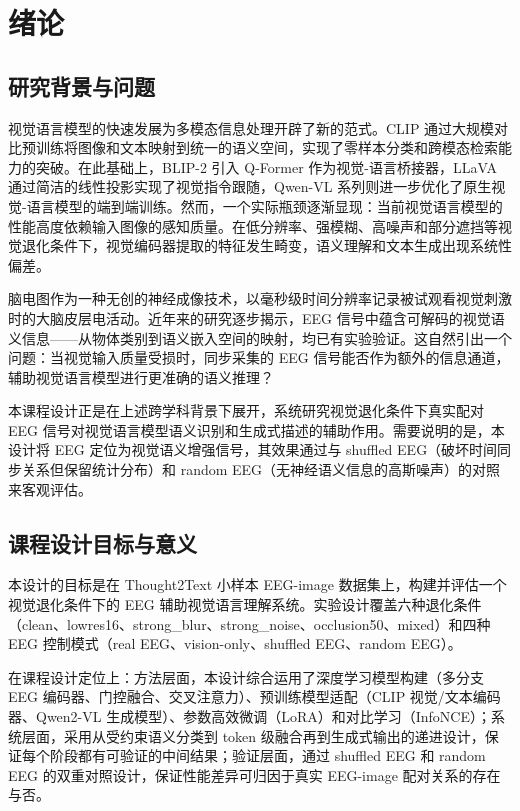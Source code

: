 \section{绪论}

\subsection{研究背景与问题}

视觉语言模型的快速发展为多模态信息处理开辟了新的范式。CLIP 通过大规模对比预训练将图像和文本映射到统一的语义空间，实现了零样本分类和跨模态检索能力的突破。在此基础上，BLIP-2 引入 Q-Former 作为视觉-语言桥接器，LLaVA 通过简洁的线性投影实现了视觉指令跟随，Qwen-VL 系列则进一步优化了原生视觉-语言模型的端到端训练。然而，一个实际瓶颈逐渐显现：当前视觉语言模型的性能高度依赖输入图像的感知质量。在低分辨率、强模糊、高噪声和部分遮挡等视觉退化条件下，视觉编码器提取的特征发生畸变，语义理解和文本生成出现系统性偏差。

脑电图作为一种无创的神经成像技术，以毫秒级时间分辨率记录被试观看视觉刺激时的大脑皮层电活动。近年来的研究逐步揭示，EEG 信号中蕴含可解码的视觉语义信息——从物体类别到语义嵌入空间的映射，均已有实验验证。这自然引出一个问题：当视觉输入质量受损时，同步采集的 EEG 信号能否作为额外的信息通道，辅助视觉语言模型进行更准确的语义推理？

本课程设计正是在上述跨学科背景下展开，系统研究视觉退化条件下真实配对 EEG 信号对视觉语言模型语义识别和生成式描述的辅助作用。需要说明的是，本设计将 EEG 定位为视觉语义增强信号，其效果通过与 shuffled EEG（破坏时间同步关系但保留统计分布）和 random EEG（无神经语义信息的高斯噪声）的对照来客观评估。

\subsection{课程设计目标与意义}

本设计的目标是在 Thought2Text 小样本 EEG-image 数据集上，构建并评估一个视觉退化条件下的 EEG 辅助视觉语言理解系统。实验设计覆盖六种退化条件（clean、lowres16、strong\_blur、strong\_noise、occlusion50、mixed）和四种 EEG 控制模式（real EEG、vision-only、shuffled EEG、random EEG）。

在课程设计定位上：方法层面，本设计综合运用了深度学习模型构建（多分支 EEG 编码器、门控融合、交叉注意力）、预训练模型适配（CLIP 视觉/文本编码器、Qwen2-VL 生成模型）、参数高效微调（LoRA）和对比学习（InfoNCE）；系统层面，采用从受约束语义分类到 token 级融合再到生成式输出的递进设计，保证每个阶段都有可验证的中间结果；验证层面，通过 shuffled EEG 和 random EEG 的双重对照设计，保证性能差异可归因于真实 EEG-image 配对关系的存在与否。

